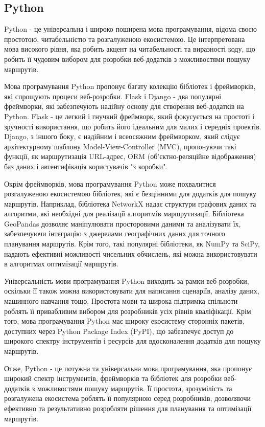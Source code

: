 \subsection{Python}
\label{subsec:python-subsection}

Python - це універсальна і широко поширена мова програмування, відома своєю простотою, читабельністю та розгалуженою екосистемою. Це інтерпретована мова високого рівня, яка робить акцент на читабельності та виразності коду, що робить її чудовим вибором для розробки веб-додатків з можливостями пошуку маршрутів.

Мова програмування Python пропонує багату колекцію бібліотек і фреймворків, які спрощують процеси веб-розробки. Flask і Django - два популярні фреймворки, які забезпечують надійну основу для створення веб-додатків на Python. Flask - це легкий і гнучкий фреймворк, який фокусується на простоті і зручності використання, що робить його ідеальним для малих і середніх проектів. Django, з іншого боку, є надійним і всеосяжним фреймворком, який слідує архітектурному шаблону Model-View-Controller (MVC), пропонуючи такі функції, як маршрутизація URL-адрес, ORM (об'єктно-реляційне відображення) баз даних і автентифікація користувачів "з коробки".

Окрім фреймворків, мова програмування Python може похвалитися розгалуженою екосистемою бібліотек, які є безцінними для додатків для пошуку маршрутів. Наприклад, бібліотека NetworkX надає структури графових даних та алгоритми, які необхідні для реалізації алгоритмів маршрутизації. Бібліотека GeoPandas дозволяє маніпулювати просторовими даними та аналізувати їх, забезпечуючи інтеграцію з джерелами географічних даних для точного планування маршрутів. Крім того, такі популярні бібліотеки, як NumPy та SciPy, надають ефективні можливості чисельних обчислень, які можна використовувати в алгоритмах оптимізації маршрутів.

Універсальність мови програмування Python виходить за рамки веб-розробки, оскільки її також можна використовувати для написання сценаріїв, аналізу даних, машинного навчання тощо. Простота мови та широка підтримка спільноти роблять її привабливим вибором для розробників усіх рівнів кваліфікації. Крім того, мова програмування Python має широку екосистему сторонніх пакетів, доступних через Python Package Index (PyPI), що забезпечує доступ до широкого спектру інструментів і ресурсів для вдосконалення додатків для пошуку маршрутів.

Отже, Python - це потужна та універсальна мова програмування, яка пропонує широкий спектр інструментів, фреймворків та бібліотек для розробки веб-додатків з можливостями пошуку маршрутів. Її простота, зрозумілість та розгалужена екосистема роблять її популярною серед розробників, дозволяючи ефективно та результативно розробляти рішення для планування та оптимізації маршрутів.

